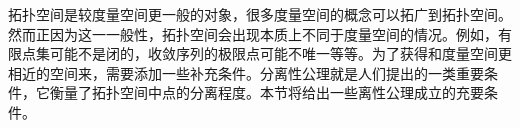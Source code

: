 
拓扑空间是较度量空间更一般的对象，很多度量空间的概念可以拓广到拓扑空间。然而正因为这一一般性，拓扑空间会出现本质上不同于度量空间的情况。例如，有限点集可能不是闭的，收敛序列的极限点可能不唯一等等。为了获得和度量空间更相近的空间来，需要添加一些补充条件。分离性公理就是人们提出的一类重要条件，它衡量了拓扑空间中点的分离程度。本节将给出一些离性公理成立的充要条件。


















